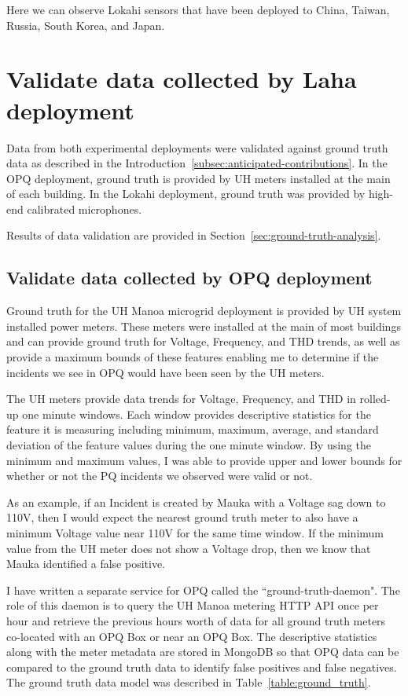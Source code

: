 Here we can observe Lokahi sensors that have been deployed to China, Taiwan, Russia, South Korea, and Japan.

\section{Validate data collected by Laha deployment}\label{sec:validate-data-collected-by-laha-deployment}
Data from both experimental deployments were validated against ground truth data as described in the Introduction~\ref{subsec:anticipated-contributions}. In the OPQ deployment, ground truth is provided by UH meters installed at the main of each building. In the Lokahi deployment, ground truth was provided by high-end calibrated microphones.

Results of data validation are provided in Section~\ref{sec:ground-truth-analysis}.

\subsection{Validate data collected by OPQ deployment}\label{subsec:validate-data-collected-by-opq-deployment}

Ground truth for the UH Manoa microgrid deployment is provided by UH system installed power meters. These meters were installed at the main of most buildings and can provide ground truth for Voltage, Frequency, and THD trends, as well as provide a maximum bounds of these features enabling me to determine if the incidents we see in OPQ would have been seen by the UH meters.

The UH meters provide data trends for Voltage, Frequency, and THD in rolled-up one minute windows. Each window provides descriptive statistics for the feature it is measuring including minimum, maximum, average, and standard deviation of the feature values during the one minute window. By using the minimum and maximum values, I was able to provide upper and lower bounds for whether or not the PQ incidents we observed were valid or not.

As an example, if an Incident is created by Mauka with a Voltage sag down to 110V, then I would expect the nearest ground truth meter to also have a minimum Voltage value near 110V for the same time window. If the minimum value from the UH meter does not show a Voltage drop, then we know that Mauka identified a false positive.

I have written a separate service for OPQ called the ``ground-truth-daemon". The role of this daemon is to query the UH Manoa metering HTTP API once per hour and retrieve the previous hours worth of data for all ground truth meters co-located with an OPQ Box or near an OPQ Box. The descriptive statistics along with the meter metadata are stored in MongoDB so that OPQ data can be compared to the ground truth data to identify false positives and false negatives. The ground truth data model was described in Table~\ref{table:ground_truth}.

